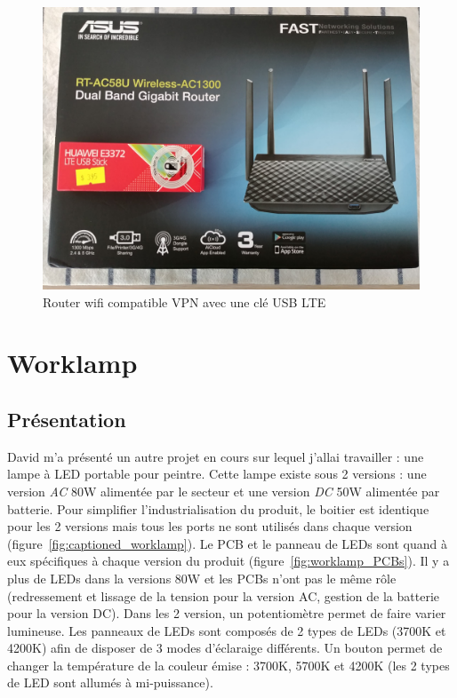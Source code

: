 \documentclass[a4paper, 11pt]{report}
\begin{document}
\begin{figure}[!h]
\begin{center}
\includegraphics[scale=0.12]{figures/photos/wifi_router.jpg}
\end{center}
\caption{Router wifi compatible VPN avec une clé USB LTE}
\label{fig:wifi_router}
\end{figure}

\section{Worklamp}
\subsection{Présentation}
David m’a présenté un autre projet en cours sur lequel j'allai travailler : une lampe à LED portable pour peintre. Cette lampe existe sous 2 versions : une version \emph{AC} 80W alimentée par le secteur et une version \emph{DC} 50W alimentée par batterie. Pour simplifier l'industrialisation du produit, le boitier est identique pour les 2 versions mais tous les ports ne sont utilisés dans chaque version (figure~\ref{fig:captioned_worklamp}). Le PCB et le panneau de LEDs sont quand à eux spécifiques à chaque version du produit (figure~\ref{fig:worklamp_PCBs}). Il y a plus de LEDs dans la versions 80W et les PCBs n'ont pas le même rôle (redressement et lissage de la tension pour la version AC, gestion de la batterie pour la version DC).
Dans les 2 version, un potentiomètre permet de faire varier lumineuse. Les panneaux de LEDs sont composés de 2 types de LEDs (3700K et 4200K) afin de disposer de 3 modes d'éclaraige différents. Un bouton permet de changer la température de la couleur émise : 3700K, 5700K et 4200K (les 2 types de LED sont allumés à mi-puissance). 
\end{document}
